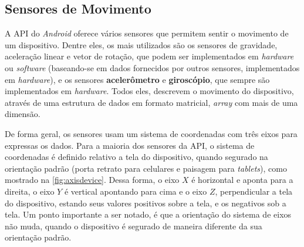 \subsection{Sensores de Movimento}
\label{subsec:motionsensors}

A API do \textit{Android} oferece vários sensores que permitem sentir o movimento de um dispositivo. Dentre eles, os mais utilizados são os sensores de gravidade, aceleração linear e vetor de rotação, que podem ser implementados em \textit{hardware} ou \textit{software} (baseando-se em dados fornecidos por outros sensores, implementados em \textit{hardware}), e os sensores \textbf{acelerômetro} e \textbf{giroscópio}, que sempre são implementados em \textit{hardware}. Todos eles, descrevem o movimento do dispositivo, através de uma estrutura de dados em formato matricial, \textit{array} com mais de uma dimensão.\par

De forma geral, os sensores usam um sistema de coordenadas com três eixos para expressas os dados. Para a maioria dos sensores da API, o sistema de coordenadas é definido relativo a tela do dispositivo, quando segurado na orientação padrão (porta retrato para celulares e paisagem para \textit{tablets}), como mostrado na \autoref{fig:axisdevice}. Dessa forma, o eixo $X$ é horizontal e aponta para a direita, o eixo $Y$ é vertical apontando para cima e o eixo $Z$, perpendicular a tela do dispositivo, estando seus valores positivos sobre a tela, e os negativos sob a tela. Um ponto importante a ser notado, é que a orientação do sistema de eixos não muda, quando o dispositivo é segurado de maneira diferente da sua orientação padrão.\par


